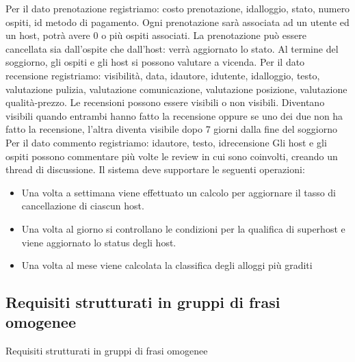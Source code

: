 \documentclass[letterpaper]{report}
\begin{document}
Per il dato prenotazione registriamo: costo prenotazione, idalloggio, stato, numero ospiti, id metodo di pagamento. Ogni prenotazione sarà associata ad un utente ed un host, potrà avere 0 o più ospiti associati. La prenotazione può essere cancellata sia dall'ospite che dall'host: verrà aggiornato lo stato.
\newline
\newline
Al termine del soggiorno, gli ospiti e gli host si possono valutare a vicenda. 
Per il dato recensione registriamo: visibilità, data, idautore, idutente, 
idalloggio, testo, valutazione pulizia, valutazione comunicazione, valutazione 
posizione, valutazione qualità-prezzo.
\newline
\newline
Le recensioni possono essere visibili o non visibili. Diventano visibili quando
entrambi hanno fatto la recensione oppure se uno dei due non ha fatto la recensione, l’altra
diventa visibile dopo 7 giorni dalla fine del soggiorno
\newline
\newline
Per il dato commento registriamo: idautore, testo, idrecensione
Gli host e gli ospiti possono commentare più volte le review in cui sono coinvolti, 
creando un thread di discussione.
\newline
\newline
Il sistema deve supportare le seguenti operazioni:
\begin{itemize}
    \item Una volta a settimana viene effettuato un calcolo per aggiornare 
    il tasso di cancellazione di ciascun host.
    \item Una volta al giorno si controllano le condizioni per la qualifica di 
    superhost e viene aggiornato lo status degli host.
    \item Una volta al mese viene calcolata la classifica degli alloggi più graditi
\end{itemize}

\subsection{Requisiti strutturati in gruppi di frasi omogenee}
Requisiti strutturati in gruppi di frasi omogenee
\end{document}
